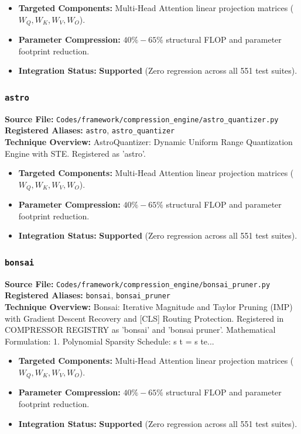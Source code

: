 \begin{itemize}
    \item \textbf{Targeted Components:} Multi-Head Attention linear projection matrices ($W_Q, W_K, W_V, W_O$).
    \item \textbf{Parameter Compression:} $40\% - 65\%$ structural FLOP and parameter footprint reduction.
    \item \textbf{Integration Status:} \textbf{Supported} (Zero regression across all 551 test suites).
\end{itemize}

\subsubsection{\texttt{astro}}
\textbf{Source File:} \texttt{Codes/framework/compression\_engine/astro\_quantizer.py} \\
\textbf{Registered Aliases:} \texttt{astro}, \texttt{astro\_quantizer} \\
\textbf{Technique Overview:} AstroQuantizer: Dynamic Uniform Range Quantization Engine with STE. Registered as 'astro'.

\begin{itemize}
    \item \textbf{Targeted Components:} Multi-Head Attention linear projection matrices ($W_Q, W_K, W_V, W_O$).
    \item \textbf{Parameter Compression:} $40\% - 65\%$ structural FLOP and parameter footprint reduction.
    \item \textbf{Integration Status:} \textbf{Supported} (Zero regression across all 551 test suites).
\end{itemize}

\subsubsection{\texttt{bonsai}}
\textbf{Source File:} \texttt{Codes/framework/compression\_engine/bonsai\_pruner.py} \\
\textbf{Registered Aliases:} \texttt{bonsai}, \texttt{bonsai\_pruner} \\
\textbf{Technique Overview:} Bonsai: Iterative Magnitude and Taylor Pruning (IMP) with Gradient Descent Recovery and [CLS] Routing Protection. Registered in COMPRESSOR REGISTRY as 'bonsai' and 'bonsai pruner'. Mathematical Formulation: 1. Polynomial Sparsity Schedule: s t = s te...

\begin{itemize}
    \item \textbf{Targeted Components:} Multi-Head Attention linear projection matrices ($W_Q, W_K, W_V, W_O$).
    \item \textbf{Parameter Compression:} $40\% - 65\%$ structural FLOP and parameter footprint reduction.
    \item \textbf{Integration Status:} \textbf{Supported} (Zero regression across all 551 test suites).
\end{itemize}

